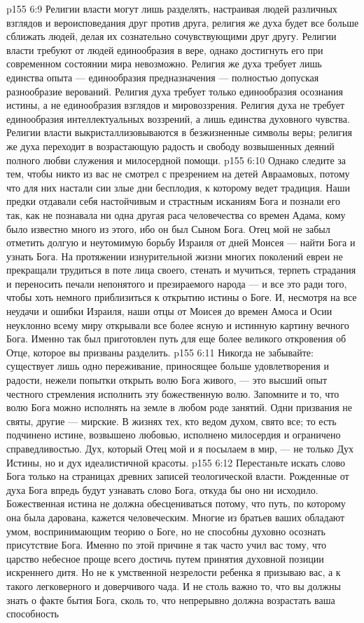 \vs p155 6:9 Религии власти могут лишь разделять, настраивая людей различных взглядов и вероисповедания друг против друга, религия же духа будет все больше сближать людей, делая их сознательно сочувствующими друг другу. Религии власти требуют от людей единообразия в вере, однако достигнуть его при современном состоянии мира невозможно. Религия же духа требует лишь единства опыта --- единообразия предназначения --- полностью допуская разнообразие верований. Религия духа требует только единообразия осознания истины, а не единообразия взглядов и мировоззрения. Религия духа не требует единообразия интеллектуальных воззрений, а лишь единства духовного чувства. Религии власти выкристаллизовываются в безжизненные символы веры; религия же духа переходит в возрастающую радость и свободу возвышенных деяний полного любви служения и милосердной помощи.
\vs p155 6:10 Однако следите за тем, чтобы никто из вас не смотрел с презрением на детей Авраамовых, потому что для них настали сии злые дни бесплодия, к которому ведет традиция. Наши предки отдавали себя настойчивым и страстным исканиям Бога и познали его так, как не познавала ни одна другая раса человечества со времен Адама, кому было известно много из этого, ибо он был Сыном Бога. Отец мой не забыл отметить долгую и неутомимую борьбу Израиля от дней Моисея --- найти Бога и узнать Бога. На протяжении изнурительной жизни многих поколений евреи не прекращали трудиться в поте лица своего, стенать и мучиться, терпеть страдания и переносить печали непонятого и презираемого народа --- и все это ради того, чтобы хоть немного приблизиться к открытию истины о Боге. И, несмотря на все неудачи и ошибки Израиля, наши отцы от Моисея до времен Амоса и Осии неуклонно всему миру открывали все более ясную и истинную картину вечного Бога. Именно так был приготовлен путь для еще более великого откровения об Отце, которое вы призваны разделить.
\vs p155 6:11 Никогда не забывайте: существует лишь одно переживание, приносящее больше удовлетворения и радости, нежели попытки открыть волю Бога живого, --- это высший опыт честного стремления исполнить эту божественную волю. Запомните и то, что волю Бога можно исполнять на земле в любом роде занятий. Одни призвания не святы, другие --- мирские. В жизнях тех, кто ведом духом, свято все; то есть подчинено истине, возвышено любовью, исполнено милосердия и ограничено справедливостью. Дух, который Отец мой и я посылаем в мир, --- не только Дух Истины, но и дух идеалистичной красоты.
\vs p155 6:12 Перестаньте искать слово Бога только на страницах древних записей теологической власти. Рожденные от духа Бога впредь будут узнавать слово Бога, откуда бы оно ни исходило. Божественная истина не должна обесцениваться потому, что путь, по которому она была дарована, кажется человеческим. Многие из братьев ваших обладают умом, воспринимающим теорию о Боге, но не способны духовно осознать присутствие Бога. Именно по этой причине я так часто учил вас тому, что царство небесное проще всего достичь путем принятия духовной позиции искреннего дитя. Но не к умственной незрелости ребенка я призываю вас, а к  такого легковерного и доверчивого чада. И не столь важно то, что вы должны знать о факте бытия Бога, сколь то, что непрерывно должна возрастать ваша способность 
